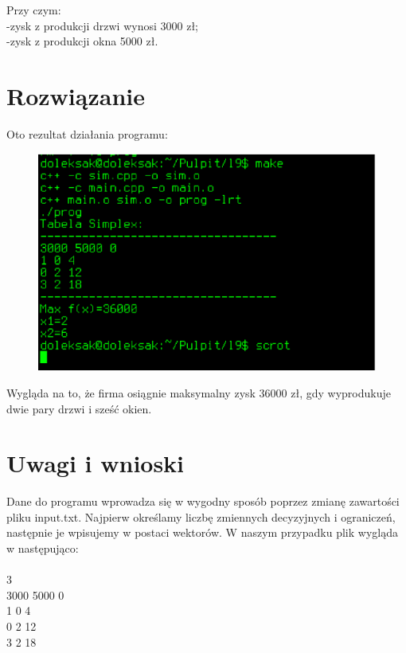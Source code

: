 \documentclass[12pt,a4paper]{article}
\begin{document}
Przy czym:\\ -zysk z produkcji drzwi wynosi 3000 zł;\\  
-zysk z produkcji okna 5000 zł.\\ \newpage

\section*{Rozwiązanie}

Oto rezultat działania programu:\\
\begin{figure}[h]
\centering
\caption[Listing programu]{}
\label{fig:print}
\includegraphics[width=0.7\linewidth]{../l9/print}
\end{figure}

Wygląda na to, że firma osiągnie maksymalny zysk 36000 zł, gdy wyprodukuje dwie pary drzwi i sześć okien.\\

\section*{Uwagi i wnioski}

Dane do programu wprowadza się w wygodny sposób poprzez zmianę zawartości pliku input.txt. Najpierw określamy liczbę zmiennych decyzyjnych i ograniczeń, następnie je wpisujemy w postaci wektorów. W naszym przypadku plik wygląda w następująco:\\
\\
 3\\

3000 5000 0\\

1 0 4\\

0 2 12\\

3 2 18
\end{document}

